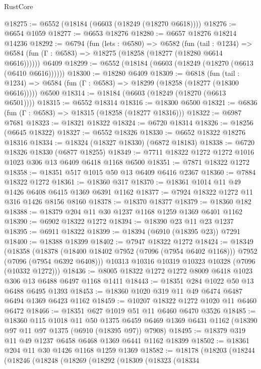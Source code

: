 \begin{lexlean}{RustCore}
\begin{coremodule}
@18275 := @6552 (@18184 (@6603 (@18249 (@18270 @6618))))
@18276 := @6654 @1059
@18277 := @6653 @18276
@18280 := @6657 @18276 @18214 @14236
@18292 := @6794
    (fun (lets : @6580) =>
    @6582
      (fun (tail : @1234) =>
      @6584 (fun (Γ : @6583) => @18275 (@18258 (@18277 (@18280 @6614 @6616))))))
    @6409
@18299 := @6552 (@18184 (@6603 (@18249 (@18270 (@6613 (@6410 @6616))))))
@18300 := @18280 @6409
@18309 := @6818
    (fun (tail : @1234) => @6584 (fun (Γ : @6583) => @18299 (@18258 (@18277 (@18300 @6616)))))
    @6500
@18314 := @18184 (@6603 (@18249 (@18270 (@6613 @6501))))
@18315 := @6552 @18314
@18316 := @18300 @6500
@18321 := @6836 (fun (Γ : @6583) => @18315 (@18258 (@18277 @18316)))
@18322 := @6987 @7681
@18323 := @18321 @18322
@18324 := @6720 @18314
@18326 := @18256 (@6645 @18322)
@18327 := @6552 @18326
@18330 := @6652 @18322 @18276 @18316
@18334 := @18324 (@18327 @18330) (@6872 @18183)
@18338 := @6720 @18326 @18330 (@6877 @18255)
@18349 := @7711 @18322 @1272 @1272 @1016 @1023 @306 @13 @6409 @6418 @1168 @6500
@18351 := @7871 @18322 @1272
@18358 := @18351 @517 @1015 @50 @13 @6409 @6416 @2367
@18360 := @7884 @18322 @1272
@18361 := @18360 @317
@18370 := @18361 @1014 @11 @49 @1426 @6408 @6415 @1369 @6391 @1162
@18377 := @7924 @18322 @1272 @11 @316 @1426 @8156 @8160
@18378 := @18370 @18377
@18379 := @18360 @182
@18388 := @18379 @204 @11 @30 @1237 @1168 @1259 @1369 @6401 @1162
@18390 := @6902 @18322 @1272
@18394 := @18390 @23 @11 @23 @1237
@18395 := @6911 @18322
@18399 := @18394 (@6910 (@18395 @23)) @7291
@18400 := @18388 @18399
@18402 := @7947 @18322 @1272
@18424 := @18349
    (@18358
      (@18378 (@18400 @18402 @7952 (@7096 (@7954 @6402 @1168))) @7952 (@7096 (@7954 @6392 @6408)))
      @10313
      @10316
      @10319
      @10323
      @10328
      (@7096 (@10332 @1272)))
@18436 := @8005 @18322 @1272 @1272 @8009 @6418 @1023 @306 @13 @6488 @6497 @1168 @1411
@18443 := @18351 @284 @1022 @50 @13 @6488 @6495 @1393
@18453 := @18360 @1020 @319 @11 @49 @6474 @6487 @6494 @1369 @6423 @1162
@18459 := @10207 @18322 @1272 @1020 @11 @6460 @6472
@18466 := @18351 @627 @1019 @51 @11 @6460 @6470 @3526
@18485 := @18360
    @115
    @1018
    @11
    @50
    @1375
    @6459
    @6469
    @1369
    @6431
    @1162
    (@18390 @97 @11 @97 @1375 (@6910 (@18395 @97)) @7908)
@18495 := @18379 @319 @11 @49 @1237 @6458 @6468 @1369 @6441 @1162 @18399
@18502 := @18361 @204 @11 @30 @1426 @1168 @1259 @1369
@18582 := @18178
    (@18203
      (@18244
        (@18246
          (@18248
            (@18269
              (@18292
                (@18309
                  (@18323
                    (@18334

\end{coremodule}
\end{lexlean}
